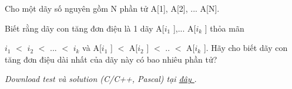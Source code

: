 Cho một dãy số nguyên gồm N phần tử A[1], A[2], ... A[N].   


   Biết rằng dãy con tăng đơn điệu là 1 dãy A[$i_{1}$   ],... A[$i_{k}$   ] thỏa mãn   


   $i_{1}$   $<$ $i_{2}$   $<$ ... $<$ $i_{k}$   và A[$i_{1}$   ] $<$ A[$i_{2}$   ] $<$ .. $<$ A[$i_{k}$   ]. Hãy cho biết dãy con tăng đơn điệu dài nhất của dãy này có bao nhiêu phần tử?   





\textit{    Download test và solution (C/C++, Pascal) tại    \href{https://vn.spoj.pl/content/liq.zip}{     đây    }}   .